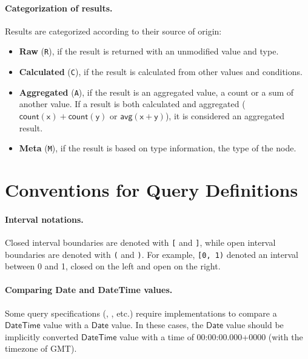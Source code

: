 \paragraph{Categorization of results.} Results are categorized according to their source of origin:

\begin{itemize}
	\item \textbf{Raw} (\texttt{R}), if the result is returned with an unmodified value and type.
	\item \textbf{Calculated} (\texttt{C}), if the result is calculated from other values and conditions.
	\item \textbf{Aggregated} (\texttt{A}), if the result is an aggregated value, \eg a count or a sum of another value. If a result is both calculated and aggregated (\eg $\mathsf{count(x) + count(y)}$ or $\mathsf{avg(x + y)}$), it is considered an aggregated result.
	\item \textbf{Meta} (\texttt{M}), if the result is based on type information, \eg the type of the node.
\end{itemize}



\section{Conventions for Query Definitions}

\paragraph{Interval notations.} Closed interval boundaries are denoted with 
\texttt{[} 
and \texttt{]}, while open interval boundaries are denoted with \texttt{(} and 
\texttt{)}. For example, \texttt{[0, 1)} denoted an interval between 0 and 1, 
closed on the left and open on the right.

\paragraph{Comparing Date and DateTime values.}

Some query specifications (\eg {}, 
, etc.) require implementations to compare a 
$\mathsf{DateTime}$ value with a $\mathsf{Date}$ value. In these cases, the 
$\mathsf{Date}$ value should be implicitly converted $\mathsf{DateTime}$ value 
with a time of 00:00:00.000+0000 (\ie with the timezone of GMT).

